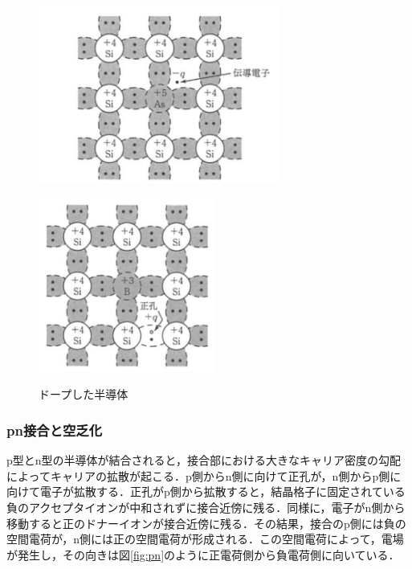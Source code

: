 \begin{figure}[h]
  \centering
  \begin{minipage}[b]{0.45\linewidth}
    \centering
    \includegraphics[width=8cm]{./figure/donner.png}
    \label{fig:Donner}
  \end{minipage}
  \begin{minipage}[b]{0.45\linewidth}
    \centering
    \includegraphics[width=5.8cm]{./figure/accepta.png}
    \label{fig:Acceptor}
  \end{minipage}
  \caption{ドープした半導体\cite{SMSze}}
\end{figure}


\subsubsection*{pn接合と空乏化}
p型とn型の半導体が結合されると，接合部における大きなキャリア密度の勾配によってキャリアの拡散が起こる．p側からn側に向けて正孔が，n側からp側に向けて電子が拡散する．正孔がp側から拡散すると，結晶格子に固定されている負のアクセプタイオンが中和されずに接合近傍に残る．同様に，電子がn側から移動すると正のドナーイオンが接合近傍に残る．その結果，接合のp側には負の空間電荷が，n側には正の空間電荷が形成される．この空間電荷によって，電場が発生し，その向きは図\ref{fig:pn}のように正電荷側から負電荷側に向いている．\par

